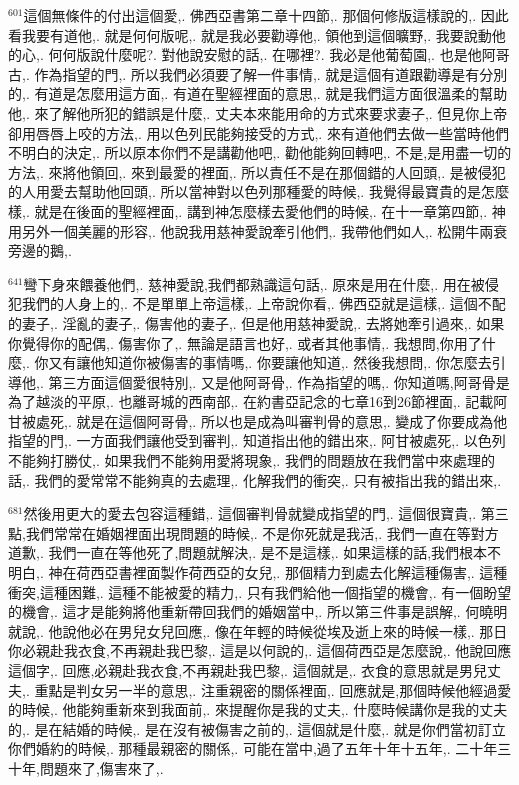 \documentclass{book}
\begin{document}
$^{601}$這個無條件的付出這個愛,.
佛西亞書第二章十四節,.
那個何修版這樣說的,.
因此看我要有道他,.
就是何何版呢,.
就是我必要勸導他,.
領他到這個曠野,.
我要說動他的心,.
何何版說什麼呢?.
對他說安慰的話,.
在哪裡?.
我必是他葡萄園,.
也是他阿哥古,.
作為指望的門,.
所以我們必須要了解一件事情,.
就是這個有道跟勸導是有分別的,.
有道是怎麼用這方面,.
有道在聖經裡面的意思,.
就是我們這方面很溫柔的幫助他,.
來了解他所犯的錯誤是什麼,.
丈夫本來能用命的方式來要求妻子,.
但見你上帝卻用唇唇上咬的方法,.
用以色列民能夠接受的方式,.
來有道他們去做一些當時他們不明白的決定,.
所以原本你們不是講勸他吧,.
勸他能夠回轉吧,.
不是,是用盡一切的方法,.
來將他領回,.
來到最愛的裡面,.
所以責任不是在那個錯的人回頭,.
是被侵犯的人用愛去幫助他回頭,.
所以當神對以色列那種愛的時候,.
我覺得最寶貴的是怎麼樣,.
就是在後面的聖經裡面,.
講到神怎麼樣去愛他們的時候,.
在十一章第四節,.
神用另外一個美麗的形容,.
他說我用慈神愛說牽引他們,.
我帶他們如人,.
松開牛兩衰旁邊的鵝,.

$^{641}$彎下身來餵養他們,.
慈神愛說,我們都熟識這句話,.
原來是用在什麼,.
用在被侵犯我們的人身上的,.
不是單單上帝這樣,.
上帝說你看,.
佛西亞就是這樣,.
這個不配的妻子,.
淫亂的妻子,.
傷害他的妻子,.
但是他用慈神愛說,.
去將她牽引過來,.
如果你覺得你的配偶,.
傷害你了,.
無論是語言也好,.
或者其他事情,.
我想問,你用了什麼,.
你又有讓他知道你被傷害的事情嗎,.
你要讓他知道,.
然後我想問,.
你怎麼去引導他,.
第三方面這個愛很特別,.
又是他阿哥骨,.
作為指望的嗎,.
你知道嗎,阿哥骨是為了越淡的平原,.
也離哥城的西南部,.
在約書亞記念的七章16到26節裡面,.
記載阿甘被處死,.
就是在這個阿哥骨,.
所以也是成為叫審判骨的意思,.
變成了你要成為他指望的門,.
一方面我們讓他受到審判,.
知道指出他的錯出來,.
阿甘被處死,.
以色列不能夠打勝仗,.
如果我們不能夠用愛將現象,.
我們的問題放在我們當中來處理的話,.
我們的愛常常不能夠真的去處理,.
化解我們的衝突,.
只有被指出我的錯出來,.

$^{681}$然後用更大的愛去包容這種錯,.
這個審判骨就變成指望的門,.
這個很寶貴,.
第三點,我們常常在婚姻裡面出現問題的時候,.
不是你死就是我活,.
我們一直在等對方道歉,.
我們一直在等他死了,問題就解決,.
是不是這樣,.
如果這樣的話,我們根本不明白,.
神在荷西亞書裡面製作荷西亞的女兒,.
那個精力到處去化解這種傷害,.
這種衝突,這種困難,.
這種不能被愛的精力,.
只有我們給他一個指望的機會,.
有一個盼望的機會,.
這才是能夠將他重新帶回我們的婚姻當中,.
所以第三件事是誤解,.
何曉明就說,.
他說他必在男兒女兒回應,.
像在年輕的時候從埃及逝上來的時候一樣,.
那日你必親赴我衣食,不再親赴我巴黎,.
這是以何說的,.
這個荷西亞是怎麼說,.
他說回應這個字,.
回應,必親赴我衣食,不再親赴我巴黎,.
這個就是,.
衣食的意思就是男兒丈夫,.
重點是判女另一半的意思,.
注重親密的關係裡面,.
回應就是,那個時候他經過愛的時候,.
他能夠重新來到我面前,.
來提醒你是我的丈夫,.
什麼時候講你是我的丈夫的,.
是在結婚的時候,.
是在沒有被傷害之前的,.
這個就是什麼,.
就是你們當初訂立你們婚約的時候,.
那種最親密的關係,.
可能在當中,過了五年十年十五年,.
二十年三十年,問題來了,傷害來了,.
\end{document}
